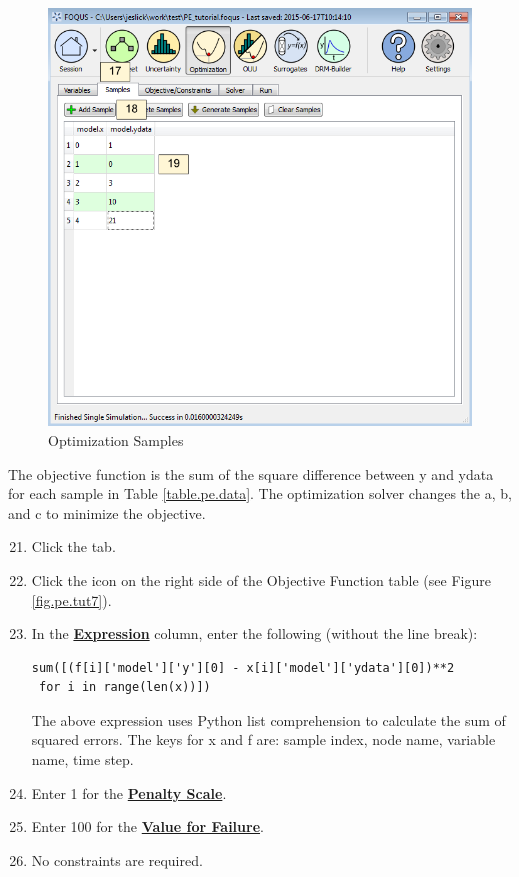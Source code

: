 \begin{figure}[H]
	\begin{center}
		\includegraphics[scale=0.55]{Chapt_optimization/figs/par_est_tut6}
		\caption{Optimization Samples}
		\label{fig.pe.tut6}
	\end{center}
\end{figure}

The objective function is the sum of the square difference between y and ydata for each sample in Table \ref{table.pe.data}. The optimization solver changes the a, b, and c to minimize the objective.

\begin{enumerate}
	\setcounter{enumi}{20}
	\item Click the  tab.
	\item Click the  icon on the right side of the Objective Function table  (see Figure \ref{fig.pe.tut7}).
	\item In the \textbf{\underline{Expression}} column, enter the following (without the line break):
	\begin{small}
	\begin{verbatim}
sum([(f[i]['model']['y'][0] - x[i]['model']['ydata'][0])**2
 for i in range(len(x))])
	\end{verbatim}
	\end{small}
	The above expression uses Python list comprehension to calculate the sum of squared errors. The keys for x and f are: sample index, node name, variable name, time step.
	\item Enter 1 for the \textbf{\underline{Penalty Scale}}.
	\item Enter 100 for the \textbf{\underline{Value for Failure}}.
	\item No constraints are required.
\end{enumerate}

